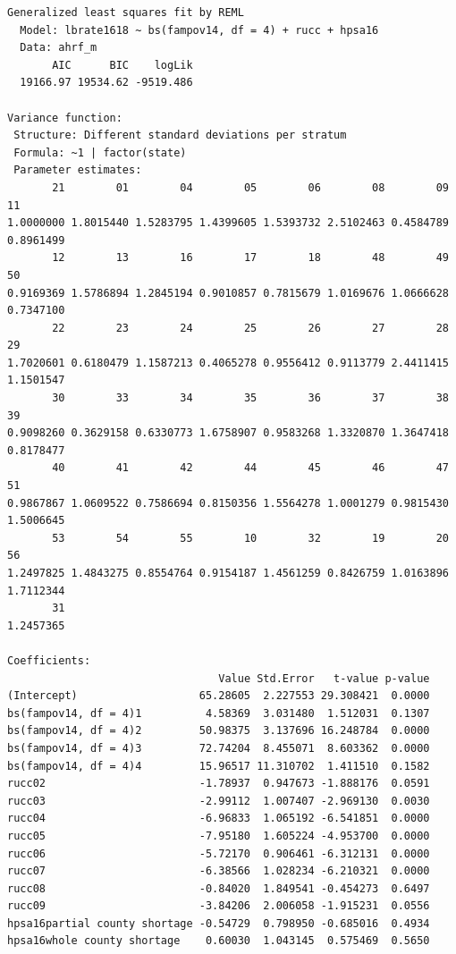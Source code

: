 \documentclass[
  letterpaper,
  DIV=11,
  numbers=noendperiod]{scrreprt}
\begin{document}
\begin{verbatim}
Generalized least squares fit by REML
  Model: lbrate1618 ~ bs(fampov14, df = 4) + rucc + hpsa16 
  Data: ahrf_m 
       AIC      BIC    logLik
  19166.97 19534.62 -9519.486

Variance function:
 Structure: Different standard deviations per stratum
 Formula: ~1 | factor(state) 
 Parameter estimates:
       21        01        04        05        06        08        09        11 
1.0000000 1.8015440 1.5283795 1.4399605 1.5393732 2.5102463 0.4584789 0.8961499 
       12        13        16        17        18        48        49        50 
0.9169369 1.5786894 1.2845194 0.9010857 0.7815679 1.0169676 1.0666628 0.7347100 
       22        23        24        25        26        27        28        29 
1.7020601 0.6180479 1.1587213 0.4065278 0.9556412 0.9113779 2.4411415 1.1501547 
       30        33        34        35        36        37        38        39 
0.9098260 0.3629158 0.6330773 1.6758907 0.9583268 1.3320870 1.3647418 0.8178477 
       40        41        42        44        45        46        47        51 
0.9867867 1.0609522 0.7586694 0.8150356 1.5564278 1.0001279 0.9815430 1.5006645 
       53        54        55        10        32        19        20        56 
1.2497825 1.4843275 0.8554764 0.9154187 1.4561259 0.8426759 1.0163896 1.7112344 
       31 
1.2457365 

Coefficients:
                                 Value Std.Error   t-value p-value
(Intercept)                   65.28605  2.227553 29.308421  0.0000
bs(fampov14, df = 4)1          4.58369  3.031480  1.512031  0.1307
bs(fampov14, df = 4)2         50.98375  3.137696 16.248784  0.0000
bs(fampov14, df = 4)3         72.74204  8.455071  8.603362  0.0000
bs(fampov14, df = 4)4         15.96517 11.310702  1.411510  0.1582
rucc02                        -1.78937  0.947673 -1.888176  0.0591
rucc03                        -2.99112  1.007407 -2.969130  0.0030
rucc04                        -6.96833  1.065192 -6.541851  0.0000
rucc05                        -7.95180  1.605224 -4.953700  0.0000
rucc06                        -5.72170  0.906461 -6.312131  0.0000
rucc07                        -6.38566  1.028234 -6.210321  0.0000
rucc08                        -0.84020  1.849541 -0.454273  0.6497
rucc09                        -3.84206  2.006058 -1.915231  0.0556
hpsa16partial county shortage -0.54729  0.798950 -0.685016  0.4934
hpsa16whole county shortage    0.60030  1.043145  0.575469  0.5650


\end{verbatim}
\end{document}
